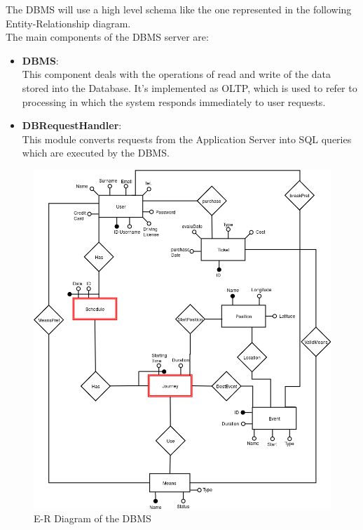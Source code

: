 \documentclass[numbers=noenddot, 12pt, a4paper, oneside]{scrbook}
\begin{document}
The DBMS will use a high level schema like the one represented in the following Entity-Relationship diagram.\\

The main components of the DBMS server are:
\begin{itemize}
	\item \textbf{DBMS}:\\\newline
	This component deals with the operations of read and write of the data stored into the Database. It's implemented as OLTP, which is used to refer to processing in which the system responds immediately to user requests.\\
	
	\item \textbf{DBRequestHandler}:\\\newline
	This module converts requests from the Application Server into SQL queries which are executed by the DBMS.\\
	
\end{itemize}



\begin{figure}[H]
	\centering
	\includegraphics[width=1.1\textwidth]{images/ER}
	\caption{E-R Diagram of the DBMS}
\end{figure}
\end{document}
